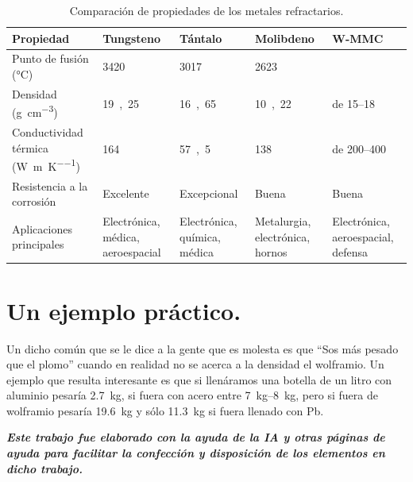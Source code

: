 \documentclass[12pt,a4paper]{article}
\begin{document}
\begin{table}[H]
    \centering
    \begin{tabular}{p{3.8cm} p{2cm} p{2cm} p{2cm} p{2cm}}
    \toprule
    Propiedad & Tungsteno & Tántalo & Molibdeno & W-MMC \\
    \midrule
    Punto de fusión (\si{\celsius}) & \si{3420} & \si{3017} & \si{2623} & \si{\approx3420} \\
    Densidad (\si{\gram\per\cubic\cm}) & \si{19,25} & \si{16,65} & \si{10,22} & de \SIrange[range-phrase={ a }]{15}{18}{} \\
    Conductividad térmica (\si{\watt\per\meter\per\kelvin}) & \si{164} & \si{57,5} & \si{138} & de \SIrange[range-phrase={ a }]{200}{400}{} \\
    Resistencia a la corrosión & Excelente & Excepcional & Buena & Buena \\
    Aplicaciones principales & Electrónica, médica, aeroespacial & Electrónica, química, médica & Metalurgia, electrónica, hornos & Electrónica, aeroespacial, defensa \\
    \bottomrule
    \end{tabular}
    \caption{Comparación de propiedades de los metales refractarios.}
\end{table}

\section{Un ejemplo práctico.}

Un dicho común que se le dice a la gente que es molesta es que \enquote{Sos más pesado que el plomo} cuando en realidad \textacutedbl{}no se acerca\textacutedbl{} a la densidad el wolframio. Un ejemplo que resulta interesante es que si llenáramos una botella de un litro con aluminio pesaría \SI{2,7}{\kilogram}, si fuera con acero entre \SIrange[range-units=single, range-phrase={ a }]{7}{8}{\kilogram}, pero si fuera de wolframio pesaría \SI{19,6}{\kilogram} y \textacutedbl{}sólo\textacutedbl{} \SI{11,3}{\kilogram} si fuera llenado con Pb.

\vfill
\textit{\textbf{Este trabajo fue elaborado con la ayuda de la IA y otras páginas de ayuda para facilitar la confección y disposición de los elementos en dicho trabajo.}}
\end{document}
